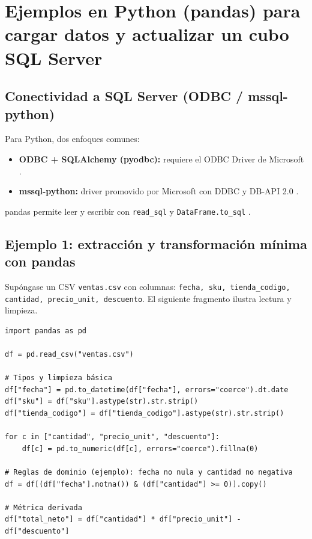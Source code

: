 \documentclass[12pt]{article}
\begin{document}
\section{Ejemplos en Python (pandas) para cargar datos y actualizar un cubo SQL Server}
\subsection{Conectividad a SQL Server (ODBC / mssql-python)}
Para Python, dos enfoques comunes:

\begin{itemize}[leftmargin=*]
\item \textbf{ODBC + SQLAlchemy (pyodbc):} requiere el ODBC Driver de Microsoft \cite{ms_odbc_download,ms_odbc_driver}.
\item \textbf{mssql-python:} driver promovido por Microsoft con DDBC y DB-API 2.0 \cite{ms_mssql_python,ms_mssql_python_quickstart}.
\end{itemize}

pandas permite leer y escribir con \texttt{read\_sql} y \texttt{DataFrame.to\_sql} \cite{pandas_read_sql,pandas_to_sql}.

\subsection{Ejemplo 1: extracción y transformación mínima con pandas}
{\raggedright
Supóngase un CSV \texttt{ventas.csv} con columnas: \texttt{fecha, sku, tienda\_codigo, cantidad, precio\_unit, descuento}. El siguiente fragmento ilustra lectura y limpieza.\par}

\begin{lstlisting}[style=python, caption={Extracción y transformación mínima (pandas)}]
import pandas as pd

df = pd.read_csv("ventas.csv")

# Tipos y limpieza básica
df["fecha"] = pd.to_datetime(df["fecha"], errors="coerce").dt.date
df["sku"] = df["sku"].astype(str).str.strip()
df["tienda_codigo"] = df["tienda_codigo"].astype(str).str.strip()

for c in ["cantidad", "precio_unit", "descuento"]:
    df[c] = pd.to_numeric(df[c], errors="coerce").fillna(0)

# Reglas de dominio (ejemplo): fecha no nula y cantidad no negativa
df = df[(df["fecha"].notna()) & (df["cantidad"] >= 0)].copy()

# Métrica derivada
df["total_neto"] = df["cantidad"] * df["precio_unit"] - df["descuento"]
\end{lstlisting}
\end{document}
